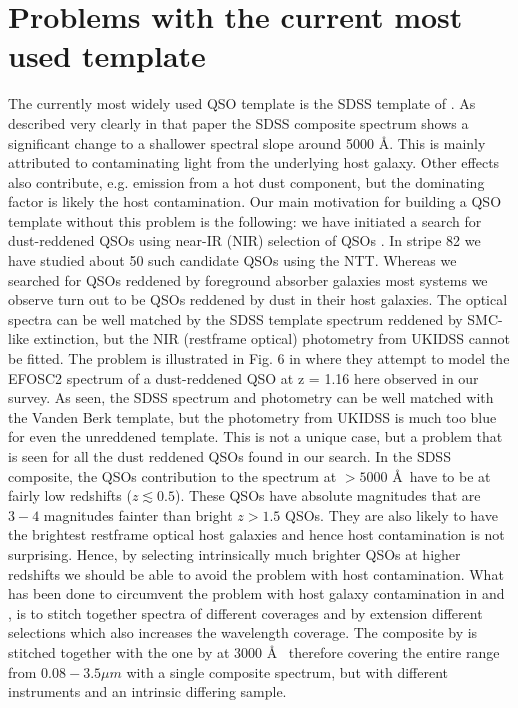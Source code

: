 \documentclass{aa}    %
\newcommand{\sectlabel}[1]{\label{sect:#1}}
\begin{document}
\section{Problems with the current most used template}   \sectlabel{problem}

The currently most widely used QSO template is the SDSS template of \citet{VandenBerk2001}. As described very clearly in that paper the SDSS composite spectrum shows a significant change to a shallower spectral slope around 5000 \AA. This is mainly attributed to contaminating light from the underlying host galaxy. Other effects also contribute, e.g. emission from a hot dust component, but the dominating factor is likely the host contamination. Our main motivation for building a QSO template without this problem is the following: we have initiated a search for dust-reddened QSOs using near-IR (NIR) selection of QSOs \citep{Fynbo2013}. In stripe 82 we have studied about 50 such candidate QSOs using the NTT. Whereas we searched for QSOs reddened by foreground absorber galaxies most systems we observe turn out to be QSOs reddened by dust in their host galaxies. The optical spectra can be well matched by the SDSS template spectrum reddened by SMC-like extinction, but the NIR (restframe optical) photometry from UKIDSS cannot be fitted. The problem is illustrated in Fig. 6 in \citet{Fynbo2013} where they attempt to model the EFOSC2 spectrum of a dust-reddened QSO at z = 1.16 here observed in our survey. As seen, the SDSS spectrum and photometry can be well matched with the Vanden Berk template, but the photometry from UKIDSS is much too blue for even the unreddened template. This is not a unique case, but a problem that is seen for all the dust reddened QSOs found in our search.
In the SDSS composite, the QSOs contribution to the spectrum at $ > 5000$ \AA~have to be at fairly low redshifts ($z \lesssim  0.5$). These QSOs have absolute magnitudes that are $3-4$ magnitudes fainter than bright $z > 1.5$ QSOs\citep[e.g.,][their Fig.~1]{VandenBerk2001}. They are also likely to have the brightest restframe optical host galaxies and hence host contamination is not surprising. Hence, by selecting intrinsically much brighter QSOs at higher redshifts we should be able to avoid the problem with host contamination.
What has been done to circumvent the problem with host galaxy contamination in \citet{Fynbo2013} and \citet{Krogager2015}, is to stitch together spectra of different coverages and by extension different selections which also increases the wavelength coverage. The composite by \citet{Glikman2006} is stitched together with the one by \citet{VandenBerk2001} at $3000$ \AA~ therefore covering the entire range from $0.08 - 3.5 \mu m$ with a single composite spectrum, but with different instruments and an intrinsic differing sample. 
\end{document}

